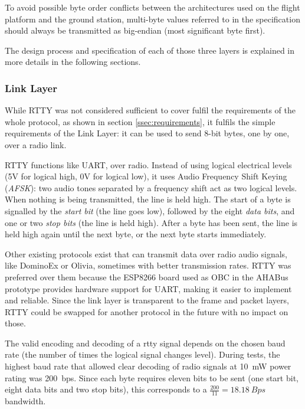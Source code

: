 To avoid possible byte order conflicts between the architectures used on the
flight platform and the ground station, multi-byte values referred to in the
specification should always be transmitted as big-endian (most significant byte
first).

The design process and specification of each of those three layers is explained
in more details in the following sections.

\subsubsection{Link Layer}
\label{sssec:link-layer}


While RTTY was not considered sufficient to cover fulfil the requirements of
the whole protocol, as shown in section \ref{ssec:requirements}, it fulfils the
simple requirements of the Link Layer: it can be used to send 8-bit bytes, one
by one, over a radio link.

RTTY functions like UART, over radio. Instead of using logical electrical levels
(5V for logical high, 0V for logical low), it uses Audio Frequency Shift Keying
(\textit{AFSK}): two audio tones separated by a frequency shift act as two
logical levels. When nothing is being transmitted, the line is held high. The
start of a byte is signalled by the \textit{start bit} (the line goes low),
followed by the eight \textit{data bits}, and one or two \textit{stop bits} (the
line is held high). After a byte has been sent, the line is held high again
until the next byte, or the next byte starts immediately.

Other existing protocols exist that can transmit data over radio audio signals,
like DominoEx or Olivia, sometimes with better transmission rates. RTTY was
preferred over them because the ESP8266 board used as OBC in the AHABus
prototype provides hardware support for UART, making it easier to implement and
reliable. Since the link layer is transparent to the frame and packet layers,
RTTY could be swapped for another protocol in the future with no impact on
those.

The valid encoding and decoding of a \acrshort{rtty} signal depends on the
chosen baud rate (the number of times the logical signal changes level). During
tests, the highest baud rate that allowed clear decoding of radio signals at
\SI{10}{mW} power rating was \SI{200}{bps}. Since each byte requires eleven
bits to be sent (one start bit, eight data bits and two stop bits), this
corresponds to a \(\frac{200}{11}=\SI{18.18}{Bps}\) bandwidth.

